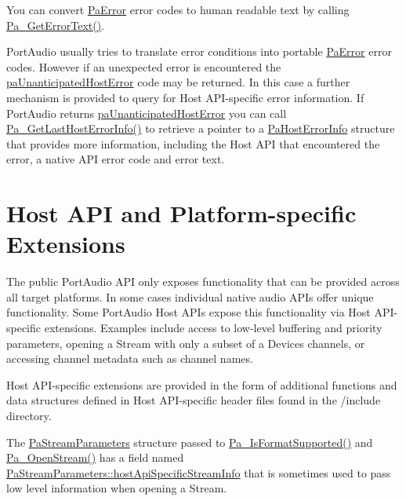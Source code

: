 You can convert \hyperlink{portaudio_8h_a4949e4a8ef9f9dbe8cbee414ce69841d}{Pa\+Error} error codes to human readable text by calling \hyperlink{portaudio_8h_ae606855a611cf29c7d2d7421df5e3b5d}{Pa\+\_\+\+Get\+Error\+Text()}.

Port\+Audio usually tries to translate error conditions into portable \hyperlink{portaudio_8h_a4949e4a8ef9f9dbe8cbee414ce69841d}{Pa\+Error} error codes. However if an unexpected error is encountered the \hyperlink{portaudio_8h_a2e45bf8b5145f131a91c128af2bdaec7a47726071f5dccc656d5e3ff20bbfc5a0}{pa\+Unanticipated\+Host\+Error} code may be returned. In this case a further mechanism is provided to query for Host A\+P\+I-\/specific error information. If Port\+Audio returns \hyperlink{portaudio_8h_a2e45bf8b5145f131a91c128af2bdaec7a47726071f5dccc656d5e3ff20bbfc5a0}{pa\+Unanticipated\+Host\+Error} you can call \hyperlink{portaudio_8h_aad573f208b60577f21d2777a7c5054e0}{Pa\+\_\+\+Get\+Last\+Host\+Error\+Info()} to retrieve a pointer to a \hyperlink{struct_pa_host_error_info}{Pa\+Host\+Error\+Info} structure that provides more information, including the Host A\+PI that encountered the error, a native A\+PI error code and error text.\hypertarget{api_overview_host_api_extensions}{}\section{Host A\+P\+I and Platform-\/specific Extensions}\label{api_overview_host_api_extensions}
The public Port\+Audio A\+PI only exposes functionality that can be provided across all target platforms. In some cases individual native audio A\+P\+Is offer unique functionality. Some Port\+Audio Host A\+P\+Is expose this functionality via Host A\+P\+I-\/specific extensions. Examples include access to low-\/level buffering and priority parameters, opening a Stream with only a subset of a Device\textquotesingle{}s channels, or accessing channel metadata such as channel names.

Host A\+P\+I-\/specific extensions are provided in the form of additional functions and data structures defined in Host A\+P\+I-\/specific header files found in the /include directory.

The \hyperlink{struct_pa_stream_parameters}{Pa\+Stream\+Parameters} structure passed to \hyperlink{portaudio_8h_abdb313743d6efef26cecdae787a2bd3d}{Pa\+\_\+\+Is\+Format\+Supported()} and \hyperlink{portaudio_8h_a443ad16338191af364e3be988014cbbe}{Pa\+\_\+\+Open\+Stream()} has a field named \hyperlink{struct_pa_stream_parameters_aff01b9fa0710ad1654471e97665c06a9}{Pa\+Stream\+Parameters\+::host\+Api\+Specific\+Stream\+Info} that is sometimes used to pass low level information when opening a Stream.

